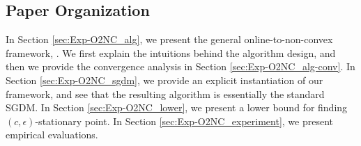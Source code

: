 




\subsection{Paper Organization}

In Section \ref{sec:Exp-O2NC_alg}, we present the general online-to-non-convex framework, \alg. We  first explain the intuitions behind the algorithm design, and then we provide the convergence analysis in Section \ref{sec:Exp-O2NC_alg-conv}. In Section \ref{sec:Exp-O2NC_sgdm}, we provide an explicit instantiation of our framework, and see that the resulting algorithm is essentially the standard SGDM.
In Section \ref{sec:Exp-O2NC_lower}, we present a lower bound for finding $(c,\epsilon)$-stationary point.
In Section \ref{sec:Exp-O2NC_experiment}, we present empirical evaluations.
